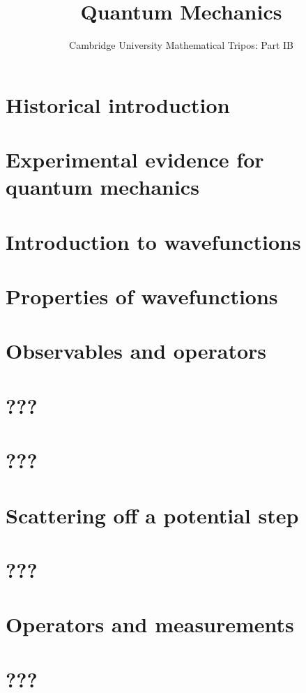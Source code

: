 \documentclass{article}
\title{Quantum Mechanics}
\author{Cambridge University Mathematical Tripos: Part IB}
\begin{document}
\maketitle

\tableofcontentsnewpage{}

\section{Historical introduction}

\section{Experimental evidence for quantum mechanics}

\section{Introduction to wavefunctions}

\section{Properties of wavefunctions}

\section{Observables and operators}

\section{???}

\section{???}

\section{Scattering off a potential step}

\section{???}

\section{Operators and measurements}

\section{???}

\end{document}
